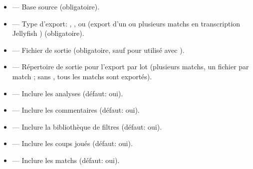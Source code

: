 \documentclass[letterpaper,10pt,french]{sphinxmanual}
\begin{document}
\sphinxAtStartPar
{}
\begin{itemize}
\item {} 
\sphinxAtStartPar
{} — Base source (obligatoire).

\item {} 
\sphinxAtStartPar
{} — Type d’export: , ,  ou
 (export d’un ou plusieurs matchs en transcription Jellyfish
) (obligatoire).

\item {} 
\sphinxAtStartPar
{} — Fichier de sortie (obligatoire, sauf pour 
utilisé avec ).

\item {} 
\sphinxAtStartPar
{} — Répertoire de sortie pour l’export  par lot (plusieurs
matchs, un fichier par match ; sans , tous les matchs sont
exportés).

\item {} 
\sphinxAtStartPar
{} — Inclure les analyses (défaut: oui).

\item {} 
\sphinxAtStartPar
{} — Inclure les commentaires (défaut: oui).

\item {} 
\sphinxAtStartPar
{} — Inclure la bibliothèque de filtres (défaut: oui).

\item {} 
\sphinxAtStartPar
{} — Inclure les coups joués (défaut: oui).

\item {} 
\sphinxAtStartPar
{} — Inclure les matchs (défaut: oui).


\end{itemize}
\end{document}
